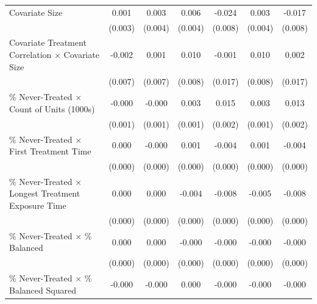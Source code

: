 \documentclass[12pt]{article}
\begin{document}
\begin{table}[htbp]
{\begin{tabular}{p{4.5in}|*{6}{c}}
Covariate Size      &       0.001         &       0.003         &       0.006         &      -0.024\sym{**} &       0.003         &      -0.017\sym{*}  \\
                    &     (0.003)         &     (0.004)         &     (0.004)         &     (0.008)         &     (0.004)         &     (0.008)         \\
Covariate Treatment Correlation $\times$ Covariate Size&      -0.002         &       0.001         &       0.010         &      -0.001         &       0.010         &       0.002         \\
                    &     (0.007)         &     (0.007)         &     (0.008)         &     (0.017)         &     (0.008)         &     (0.017)         \\
\% Never-Treated $\times$ Count of Units (1000s)&      -0.000         &      -0.000         &       0.003\sym{***}&       0.015\sym{***}&       0.003\sym{***}&       0.013\sym{***}\\
                    &     (0.001)         &     (0.001)         &     (0.001)         &     (0.002)         &     (0.001)         &     (0.002)         \\
\% Never-Treated $\times$ First Treatment Time&       0.000         &      -0.000         &       0.001\sym{***}&      -0.004\sym{***}&       0.001\sym{***}&      -0.004\sym{***}\\
                    &     (0.000)         &     (0.000)         &     (0.000)         &     (0.000)         &     (0.000)         &     (0.000)         \\
\% Never-Treated $\times$ Longest Treatment Exposure Time&       0.000         &       0.000\sym{***}&      -0.004\sym{***}&      -0.008\sym{***}&      -0.005\sym{***}&      -0.008\sym{***}\\
                    &     (0.000)         &     (0.000)         &     (0.000)         &     (0.000)         &     (0.000)         &     (0.000)         \\
\% Never-Treated $\times$ \% Balanced&       0.000\sym{***}&       0.000\sym{**} &      -0.000\sym{*}  &      -0.000         &      -0.000\sym{*}  &      -0.000         \\
                    &     (0.000)         &     (0.000)         &     (0.000)         &     (0.000)         &     (0.000)         &     (0.000)         \\
\% Never-Treated $\times$ \% Balanced Squared&      -0.000\sym{***}&      -0.000\sym{**} &       0.000         &      -0.000\sym{***}&      -0.000         &      -0.000\sym{***}\\

\end{tabular}}
\end{table}
\end{document}
